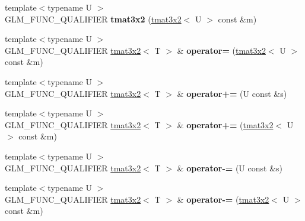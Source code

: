 \begin{DoxyCompactItemize}
\item 
\hypertarget{structglm_1_1detail_1_1tmat3x2_a803c1e14c376bd263ec8ccae8378f137}{{\footnotesize template$<$typename U $>$ }\\G\-L\-M\-\_\-\-F\-U\-N\-C\-\_\-\-Q\-U\-A\-L\-I\-F\-I\-E\-R {\bfseries tmat3x2} (\hyperlink{structglm_1_1detail_1_1tmat3x2}{tmat3x2}$<$ U $>$ const \&m)}\label{structglm_1_1detail_1_1tmat3x2_a803c1e14c376bd263ec8ccae8378f137}

\item 
\hypertarget{structglm_1_1detail_1_1tmat3x2_a3ffe522fe74a4e47b0ba85e6bd601a3b}{{\footnotesize template$<$typename U $>$ }\\G\-L\-M\-\_\-\-F\-U\-N\-C\-\_\-\-Q\-U\-A\-L\-I\-F\-I\-E\-R \hyperlink{structglm_1_1detail_1_1tmat3x2}{tmat3x2}$<$ T $>$ \& {\bfseries operator=} (\hyperlink{structglm_1_1detail_1_1tmat3x2}{tmat3x2}$<$ U $>$ const \&m)}\label{structglm_1_1detail_1_1tmat3x2_a3ffe522fe74a4e47b0ba85e6bd601a3b}

\item 
\hypertarget{structglm_1_1detail_1_1tmat3x2_a68617fea729222134358dcd0de6115f4}{{\footnotesize template$<$typename U $>$ }\\G\-L\-M\-\_\-\-F\-U\-N\-C\-\_\-\-Q\-U\-A\-L\-I\-F\-I\-E\-R \hyperlink{structglm_1_1detail_1_1tmat3x2}{tmat3x2}$<$ T $>$ \& {\bfseries operator+=} (U const \&s)}\label{structglm_1_1detail_1_1tmat3x2_a68617fea729222134358dcd0de6115f4}

\item 
\hypertarget{structglm_1_1detail_1_1tmat3x2_a2bfa942aef7f6039f190d4c0dbbc4df4}{{\footnotesize template$<$typename U $>$ }\\G\-L\-M\-\_\-\-F\-U\-N\-C\-\_\-\-Q\-U\-A\-L\-I\-F\-I\-E\-R \hyperlink{structglm_1_1detail_1_1tmat3x2}{tmat3x2}$<$ T $>$ \& {\bfseries operator+=} (\hyperlink{structglm_1_1detail_1_1tmat3x2}{tmat3x2}$<$ U $>$ const \&m)}\label{structglm_1_1detail_1_1tmat3x2_a2bfa942aef7f6039f190d4c0dbbc4df4}

\item 
\hypertarget{structglm_1_1detail_1_1tmat3x2_a1705976d62e31249e26d0d9baf996147}{{\footnotesize template$<$typename U $>$ }\\G\-L\-M\-\_\-\-F\-U\-N\-C\-\_\-\-Q\-U\-A\-L\-I\-F\-I\-E\-R \hyperlink{structglm_1_1detail_1_1tmat3x2}{tmat3x2}$<$ T $>$ \& {\bfseries operator-\/=} (U const \&s)}\label{structglm_1_1detail_1_1tmat3x2_a1705976d62e31249e26d0d9baf996147}

\item 
\hypertarget{structglm_1_1detail_1_1tmat3x2_ae922cabe9775685a5f7d2af6f904b7e4}{{\footnotesize template$<$typename U $>$ }\\G\-L\-M\-\_\-\-F\-U\-N\-C\-\_\-\-Q\-U\-A\-L\-I\-F\-I\-E\-R \hyperlink{structglm_1_1detail_1_1tmat3x2}{tmat3x2}$<$ T $>$ \& {\bfseries operator-\/=} (\hyperlink{structglm_1_1detail_1_1tmat3x2}{tmat3x2}$<$ U $>$ const \&m)}\label{structglm_1_1detail_1_1tmat3x2_ae922cabe9775685a5f7d2af6f904b7e4}


\end{DoxyCompactItemize}
